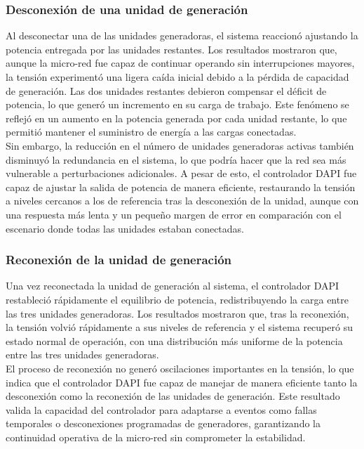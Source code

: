 \subsubsection{Desconexión de una unidad de generación}


Al desconectar una de las unidades generadoras, el sistema reaccionó ajustando la potencia entregada por las unidades restantes. Los resultados mostraron que, aunque la micro-red fue capaz de continuar operando sin interrupciones mayores, la tensión experimentó una ligera caída inicial debido a la pérdida de capacidad de generación. Las dos unidades restantes debieron compensar el déficit de potencia, lo que generó un incremento en su carga de trabajo. Este fenómeno se reflejó en un aumento en la potencia generada por cada unidad restante, lo que permitió mantener el suministro de energía a las cargas conectadas.\\

Sin embargo, la reducción en el número de unidades generadoras activas también disminuyó la redundancia en el sistema, lo que podría hacer que la red sea más vulnerable a perturbaciones adicionales. A pesar de esto, el controlador DAPI fue capaz de ajustar la salida de potencia de manera eficiente, restaurando la tensión a niveles cercanos a los de referencia tras la desconexión de la unidad, aunque con una respuesta más lenta y un pequeño margen de error en comparación con el escenario donde todas las unidades estaban conectadas.

\subsubsection{Reconexión de la unidad de generación}


Una vez reconectada la unidad de generación al sistema, el controlador DAPI restableció rápidamente el equilibrio de potencia, redistribuyendo la carga entre las tres unidades generadoras. Los resultados mostraron que, tras la reconexión, la tensión volvió rápidamente a sus niveles de referencia y el sistema recuperó su estado normal de operación, con una distribución más uniforme de la potencia entre las tres unidades generadoras.\\

El proceso de reconexión no generó oscilaciones importantes en la tensión, lo que indica que el controlador DAPI fue capaz de manejar de manera eficiente tanto la desconexión como la reconexión de las unidades de generación. Este resultado valida la capacidad del controlador para adaptarse a eventos como fallas temporales o desconexiones programadas de generadores, garantizando la continuidad operativa de la micro-red sin comprometer la estabilidad.

